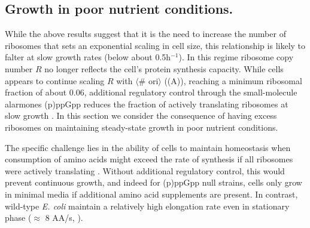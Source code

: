 \subsection{Growth in poor nutrient conditions.}
While the above results suggest that it is the need to increase the number of
ribosomes that sets an exponential scaling in cell size, this relationship is
likely to falter at slow growth rates (below about 0.5h$^{-1}$). In this regime
ribosome copy number $R$ no longer reflects the cell's protein synthesis
capacity. While cells appears to continue scaling $R$ with $\langle$\# ori$\rangle$
((A)), reaching a minimum ribosomal fraction of about
0.06, additional regulatory control through the small-molecule alarmones
(p)ppGpp  reduces the fraction of actively translating ribosomes at slow growth
\citep{dai2016, bosdriesz2015, zhu2019}. In this section we consider the
consequence of having excess ribosomes on maintaining steady-state growth in
poor nutrient conditions.

The specific challenge lies in the ability of cells to maintain homeostasis when
consumption of amino acids might exceed the rate of synthesis
if all ribosomes were actively translating .
Without additional regulatory control, this would prevent continuous growth, and
indeed for (p)ppGpp null strains, cells only grow in minimal media if additional
amino acid supplements are present. In contrast, wild-type \textit{E. coli}
maintain a relatively high elongation rate even in stationary phase
($\approx$ 8 AA/s, \citep{dai2016, dai2018}).




